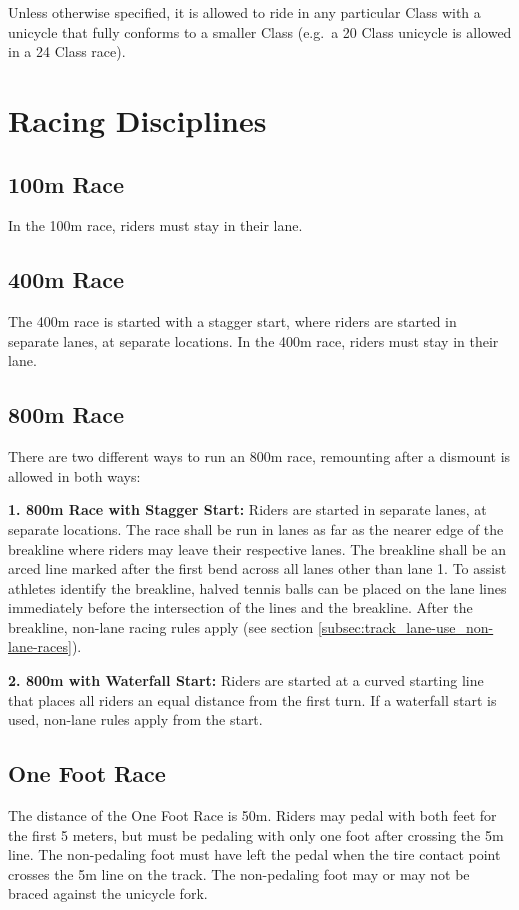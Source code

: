 Unless otherwise specified, it is allowed to ride in any particular Class with a unicycle that fully conforms to a smaller Class
(e.g.\ a 20 Class unicycle is allowed in a 24 Class race).

\section{Racing Disciplines}

\subsection{100m Race}

In the 100m race, riders must stay in their lane.

\subsection{400m Race}

The 400m race is started with a stagger start, where riders are started in separate lanes, at separate locations.
In the 400m race, riders must stay in their lane.

\subsection{800m Race}

There are two different ways to run an 800m race, remounting after a dismount is allowed in both ways:

\textbf{1. 800m Race with Stagger Start:} Riders are started in separate lanes, at separate locations.
The race shall be run in lanes as far as the nearer edge of the breakline where riders may leave their respective lanes.
The breakline shall be an arced line marked after the first bend across all lanes other than lane 1.
To assist athletes identify the breakline, halved tennis balls can be placed on the lane lines immediately before the intersection of the lines and the breakline.
After the breakline, non-lane racing rules apply (see section \ref{subsec:track_lane-use_non-lane-races}).

\textbf{2. 800m with Waterfall Start:} Riders are started at a curved starting line that places all riders an equal distance from the first turn.
If a waterfall start is used, non-lane rules apply from the start.

\subsection{One Foot Race}
The distance of the One Foot Race is 50m.
Riders may pedal with both feet for the first 5 meters, but must be pedaling with only one foot after crossing the 5m line.
The non-pedaling foot must have left the pedal when the tire contact point crosses the 5m line on the track.
The non-pedaling foot may or may not be braced against the unicycle fork.


